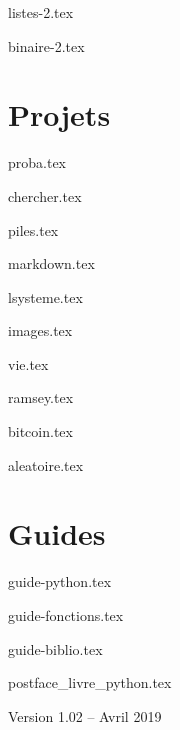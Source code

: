 \documentclass[11pt]{report}
\begin{document}
{listes-2.tex}

{binaire-2.tex}



\part{Projets}

{proba.tex}

{chercher.tex}

{piles.tex}

{markdown.tex}

{lsysteme.tex}

{images.tex}

{vie.tex}

{ramsey.tex}

{bitcoin.tex}

{aleatoire.tex}






\part{Guides}

{guide-python.tex}

{guide-fonctions.tex}

{guide-biblio.tex}



\clearemptydoublepage


{postface_livre_python.tex}

\vfill
\bigskip
\bigskip

\centerline{Version 1.02 -- Avril 2019}
\end{document}
